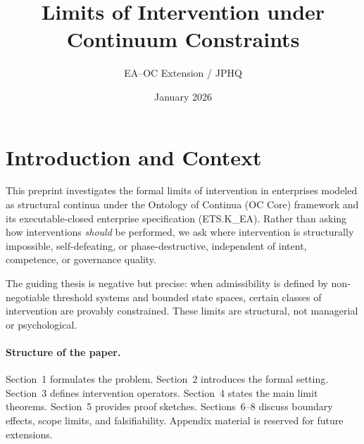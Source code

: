 ﻿\documentclass[11pt]{article}
\title{Limits of Intervention under Continuum Constraints}
\author{EA--OC Extension / JPHQ}
\date{January 2026}
\begin{document}
\maketitle



\section{Introduction and Context}
This preprint investigates the formal limits of intervention in enterprises
modeled as structural continua under the Ontology of Continua (OC Core)
framework and its executable-closed enterprise specification (ETS.K\_EA).
Rather than asking how interventions \emph{should} be performed, we ask where
intervention is structurally impossible, self-defeating, or phase-destructive,
independent of intent, competence, or governance quality.

The guiding thesis is negative but precise: when admissibility is defined by
non-negotiable threshold systems and bounded state spaces, certain classes of
intervention are provably constrained. These limits are structural, not
managerial or psychological.

\paragraph{Structure of the paper.}
Section~1 formulates the problem.
Section~2 introduces the formal setting.
Section~3 defines intervention operators.
Section~4 states the main limit theorems.
Section~5 provides proof sketches.
Sections~6--8 discuss boundary effects, scope limits, and falsifiability.
Appendix material is reserved for future extensions.









\end{document}
